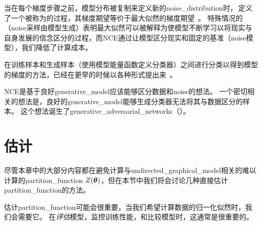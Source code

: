 当在每个梯度步骤之前，模型分布被复制来定义新的\gls{noise_distribution}时，\,定义了一个被称为的过程，其梯度期望等价于最大似然的梯度期望~\citep{Goodfellow-ICLR2015}。
特殊情况的\,（\gls{noise}采样由模型生成）表明最大似然可以被解释为使模型不断学习以将现实与自身发展的信念区分的过程，而\gls{NCE}通过让模型区分现实和固定的基准（\gls{noise}模型），我们降低了计算成本。%


在训练样本和生成样本（使用模型能量函数定义分类器）之间进行分类以得到模型的梯度的方法，已经在更早的时候以各种形式提出来~\citep{Welling2003b,Bengio-2009-book}。


\gls{NCE}是基于良好\gls{generative_model}应该能够区分数据和\gls{noise}的想法。
一个密切相关的想法是，良好的\gls{generative_model}能够生成分类器无法将其与数据区分的样本。
这个想法诞生了\gls{generative_adversarial_networks}（）。


\section{估计}
\label{sec:estimating_the_partition_function}
尽管本章中的大部分内容都在避免计算与\gls{undirected_graphical_model}相关的难以计算的\gls{partition_function} $Z(\boldsymbol{\theta})$，但在本节中我们将会讨论几种直接估计\gls{partition_function}的方法。


估计\gls{partition_function}可能会很重要，当我们希望计算数据的归一化似然时，我们会需要它。
在\emph{评估}模型，监控训练性能，和比较模型时，这通常是很重要的。


